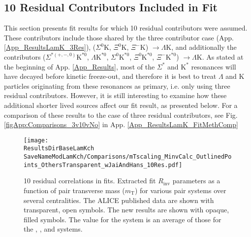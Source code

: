 \documentclass[/home/jesse/Analysis/FemtoAnalysis/AnalysisNotes/AnalysisNoteJBuxton.tex]{subfiles}
\renewcommand{\NonFlatBgdLamKch}{_NonFlatBgdCrctnLamK0LinearLamKchPolynomial}
\renewcommand{\ResNum}{_10Res}
\renewcommand{\PrimMaxDecay}{_PrimMaxDecay4fm}
\renewcommand{\SaveNameModLamKch}{\MomRes\NonFlatBgdLamKch\ResNum\PrimMaxDecay\ResMethod\ParamFixAndShareLamKch}
\begin{document}
\subsection{10 Residual Contributors Included in Fit}
\label{App_ResultsLamK_10Res}

This section presents fit results for which 10 residual contributors were assumed.
These contributors include those shared by the three contributor case (App. \ref{App_ResultsLamK_3Res}), ($\Sigma^{0}\mathrm{K}$, $\Xi^{0}\mathrm{K}$, $\Xi^{-}\mathrm{K}$) $\rightarrow \Lambda\mathrm{K}$, and additionally the contributors ($\Sigma^{* (+,-,0)}\mathrm{K}^{*0}$, $\Lambda\mathrm{K}^{*0}$, $\Sigma^{0}\mathrm{K}^{*0}$, $\Xi^{0}\mathrm{K}^{*0}$, $\Xi^{-}\mathrm{K}^{*0}$) $\rightarrow \Lambda\mathrm{K}$.
As stated at the beginning of App. \ref{App_Results}, most of the $\Sigma^{*}$ and $\mathrm{K}^{*}$ resonances will have decayed before kinetic freeze-out, and therefore it is best to treat $\Lambda$ and $\mathrm{K}$ particles originating from these resonances as primary, i.e. only using three residual contributors.
However, it is still interesting to examine how these additional shorter lived sources affect our fit result, as presented below.
For a comparison of these results to the case of three residual contributors, see Fig. \ref{figApp:Comparisons_3v10vNo} in App. \ref{App_ResultsLamK_FitMethComp}

\begin{figure}[h]
  \centering
  \texttt{[image: \\ResultsDirBaseLamKch\\SaveNameModLamKch/Comparisons/mTscaling\_MinvCalc\_OutlinedPoints\_OthersTransparent\_wJaiAndHans\_10Res.pdf]}
  \caption[$m_{\mathrm{T}}$ scaling of radii: 10 residuals]
  {
  10 residual correlations in \LamK fits.  
  Extracted fit $R_{\mathrm{inv}}$ parameters as a function of pair transverse mass ($m_{\mathrm{T}}$) for various pair systems over several centralities. 
  The ALICE published data \cite{Adam:2015vja} are shown with transparent, open symbols.  
  The new \LamK results are shown with opaque, filled symbols.  
  The \mt value for the \LamK system is an average of those for the \LamKchP, \ALamKchM, and \LamKs systems.
  }
  \label{figApp:mTScalingOfRadii_10Res}
\end{figure}
\end{document}
